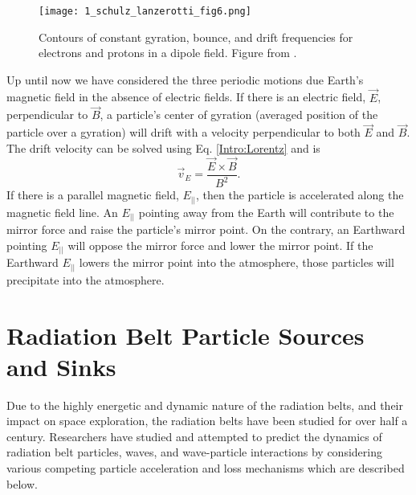 \begin{figure}
\texttt{[image: 1\_schulz\_lanzerotti\_fig6.png]}
\caption{Contours of constant gyration, bounce, and drift frequencies for electrons and protons in a dipole field. Figure from \citet{Schulz1974}.}
\label{Intro:adiabatic_frequencies}
\end{figure}

Up until now we have considered the three periodic motions due Earth's magnetic field in the absence of electric fields. If there is an electric field, $\vec{E}$, perpendicular to $\vec{B}$, a particle's center of gyration (averaged position of the particle over a gyration) will drift with a velocity perpendicular to both $\vec{E}$ and $\vec{B}$. The drift velocity can be solved using Eq. \ref{Intro:Lorentz} and is
\begin{equation}
\vec{v}_E = \frac{\vec{E} \times \vec{B}}{B^2}.
\end{equation} If there is a parallel magnetic field, $E_{||}$, then the particle is accelerated along the magnetic field line. An $E_{||}$  pointing away from the Earth will contribute to the mirror force and raise the particle's mirror point. On the contrary, an Earthward pointing $E_{||}$ will oppose the mirror force and lower the mirror point. If the Earthward $E_{||}$ lowers the mirror point into the atmosphere, those particles will precipitate into the atmosphere.

\section{Radiation Belt Particle Sources and Sinks}\label{Intro:sources_sinks}
Due to the highly energetic and dynamic nature of the radiation belts, and their impact on space exploration, the radiation belts have been studied for over half a century. Researchers have studied and attempted to predict the dynamics of radiation belt particles, waves, and wave-particle interactions by considering various competing particle acceleration and loss mechanisms which are described below.


